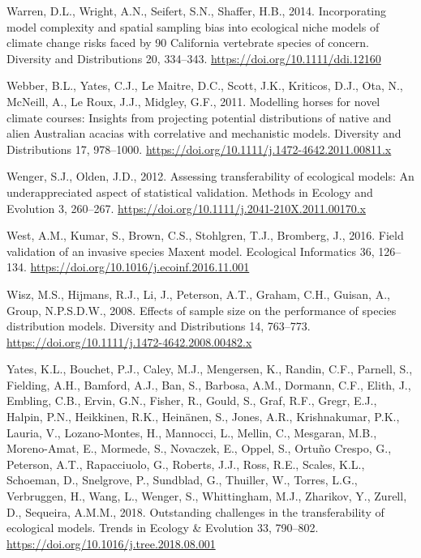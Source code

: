 \documentclass[12pt,]{article}
\begin{document}
\begin{CSLReferences}{1}{0}
\leavevmode\hypertarget{ref-Warren2014}{}%
Warren, D.L., Wright, A.N., Seifert, S.N., Shaffer, H.B., 2014.
Incorporating model complexity and spatial sampling bias into ecological
niche models of climate change risks faced by 90 {California} vertebrate
species of concern. Diversity and Distributions 20, 334--343.
\url{https://doi.org/10.1111/ddi.12160}

\leavevmode\hypertarget{ref-Webber2011}{}%
Webber, B.L., Yates, C.J., Le Maitre, D.C., Scott, J.K., Kriticos, D.J.,
Ota, N., McNeill, A., Le Roux, J.J., Midgley, G.F., 2011. Modelling
horses for novel climate courses: Insights from projecting potential
distributions of native and alien {Australian} acacias with correlative
and mechanistic models. Diversity and Distributions 17, 978--1000.
\url{https://doi.org/10.1111/j.1472-4642.2011.00811.x}

\leavevmode\hypertarget{ref-Wenger2012}{}%
Wenger, S.J., Olden, J.D., 2012. Assessing transferability of ecological
models: An underappreciated aspect of statistical validation. Methods in
Ecology and Evolution 3, 260--267.
\url{https://doi.org/10.1111/j.2041-210X.2011.00170.x}

\leavevmode\hypertarget{ref-West2016}{}%
West, A.M., Kumar, S., Brown, C.S., Stohlgren, T.J., Bromberg, J., 2016.
Field validation of an invasive species {Maxent} model. Ecological
Informatics 36, 126--134.
\url{https://doi.org/10.1016/j.ecoinf.2016.11.001}

\leavevmode\hypertarget{ref-Wisz2008}{}%
Wisz, M.S., Hijmans, R.J., Li, J., Peterson, A.T., Graham, C.H., Guisan,
A., Group, N.P.S.D.W., 2008. Effects of sample size on the performance
of species distribution models. Diversity and Distributions 14,
763--773. \url{https://doi.org/10.1111/j.1472-4642.2008.00482.x}

\leavevmode\hypertarget{ref-Yates2018}{}%
Yates, K.L., Bouchet, P.J., Caley, M.J., Mengersen, K., Randin, C.F.,
Parnell, S., Fielding, A.H., Bamford, A.J., Ban, S., Barbosa, A.M.,
Dormann, C.F., Elith, J., Embling, C.B., Ervin, G.N., Fisher, R., Gould,
S., Graf, R.F., Gregr, E.J., Halpin, P.N., Heikkinen, R.K., Heinänen,
S., Jones, A.R., Krishnakumar, P.K., Lauria, V., Lozano-Montes, H.,
Mannocci, L., Mellin, C., Mesgaran, M.B., Moreno-Amat, E., Mormede, S.,
Novaczek, E., Oppel, S., Ortuño Crespo, G., Peterson, A.T., Rapacciuolo,
G., Roberts, J.J., Ross, R.E., Scales, K.L., Schoeman, D., Snelgrove,
P., Sundblad, G., Thuiller, W., Torres, L.G., Verbruggen, H., Wang, L.,
Wenger, S., Whittingham, M.J., Zharikov, Y., Zurell, D., Sequeira,
A.M.M., 2018. Outstanding challenges in the transferability of
ecological models. Trends in Ecology \& Evolution 33, 790--802.
\url{https://doi.org/10.1016/j.tree.2018.08.001}

\end{CSLReferences}
\end{document}
